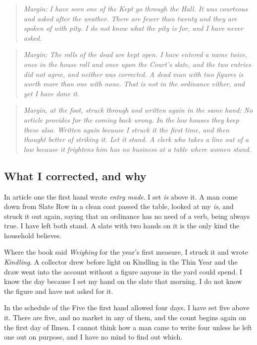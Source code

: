 \documentclass{design/chronicle}
\begin{document}
\begin{quote}\itshape \emph{Margin:} I have seen one of the Kept go through the Hall. It was courteous and asked after the weather. There are fewer than twenty and they are spoken of with pity. I do not know what the pity is for, and I have never asked.\end{quote}

\begin{quote}\itshape \emph{Margin:} The rolls of the dead are kept open. I have entered a name twice, once in the house roll and once upon the Court’s slate, and the two entries did not agree, and neither was corrected. A dead man with two figures is worth more than one with none. That is not in the ordinance either, and yet I have done it.\end{quote}

\begin{quote}\itshape \emph{Margin, at the foot, struck through and written again in the same hand:} No article provides for the coming back wrong. In the low houses they keep these also. \emph{Written again because I struck it the first time, and then thought better of striking it. Let it stand. A clerk who takes a line out of a law because it frightens him has no business at a table where women stand.}\end{quote}

\subsection*{What I corrected, and why}

In article one the first hand wrote \emph{entry made}. I set \emph{is} above it. A man come down from Slate Row in a clean coat passed the table, looked at my \emph{is}, and struck it out again, saying that an ordinance has no need of a verb, being always true. I have left both stand. A slate with two hands on it is the only kind the household believes.

Where the book said \emph{Weighing} for the year’s first measure, I struck it and wrote \emph{Kindling}. A collector drew before light on Kindling in the Thin Year and the draw went into the account without a figure anyone in the yard could spend. I know the day because I set my hand on the slate that morning. I do not know the figure and have not asked for it.

In the schedule of the Five the first hand allowed four days. I have set five above it. There are five, and no market in any of them, and the count begins again on the first day of Ilmen. I cannot think how a man came to write four unless he left one out on purpose, and I have no mind to find out which.
\end{document}
